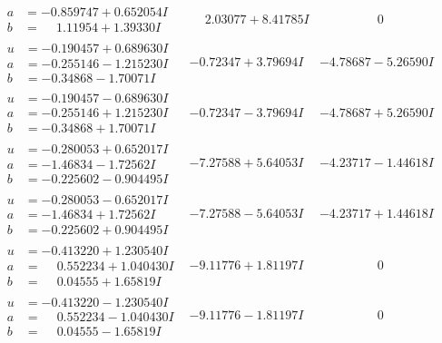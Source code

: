 \documentclass[1p]{elsarticle_modified}
\theoremstyle{definition}
\begin{document}
$$\begin{array}{c|c|c}
\begin{aligned}
a &= -0.859747 + 0.652054 I \\
b &= \phantom{-}1.11954 + 1.39330 I\end{aligned}
 & \phantom{-}2.03077 + 8.41785 I & \phantom{-0.000000 } 0 \\ \hline\begin{aligned}
u &= -0.190457 + 0.689630 I \\
a &= -0.255146 - 1.215230 I \\
b &= -0.34868 - 1.70071 I\end{aligned}
 & -0.72347 + 3.79694 I & -4.78687 - 5.26590 I \\ \hline\begin{aligned}
u &= -0.190457 - 0.689630 I \\
a &= -0.255146 + 1.215230 I \\
b &= -0.34868 + 1.70071 I\end{aligned}
 & -0.72347 - 3.79694 I & -4.78687 + 5.26590 I \\ \hline\begin{aligned}
u &= -0.280053 + 0.652017 I \\
a &= -1.46834 - 1.72562 I \\
b &= -0.225602 - 0.904495 I\end{aligned}
 & -7.27588 + 5.64053 I & -4.23717 - 1.44618 I \\ \hline\begin{aligned}
u &= -0.280053 - 0.652017 I \\
a &= -1.46834 + 1.72562 I \\
b &= -0.225602 + 0.904495 I\end{aligned}
 & -7.27588 - 5.64053 I & -4.23717 + 1.44618 I \\ \hline\begin{aligned}
u &= -0.413220 + 1.230540 I \\
a &= \phantom{-}0.552234 + 1.040430 I \\
b &= \phantom{-}0.04555 + 1.65819 I\end{aligned}
 & -9.11776 + 1.81197 I & \phantom{-0.000000 } 0 \\ \hline\begin{aligned}
u &= -0.413220 - 1.230540 I \\
a &= \phantom{-}0.552234 - 1.040430 I \\
b &= \phantom{-}0.04555 - 1.65819 I\end{aligned}
 & -9.11776 - 1.81197 I & \phantom{-0.000000 } 0 \\ \hline\begin{aligned}

\end{aligned}
\end{array}$$
\end{document}
